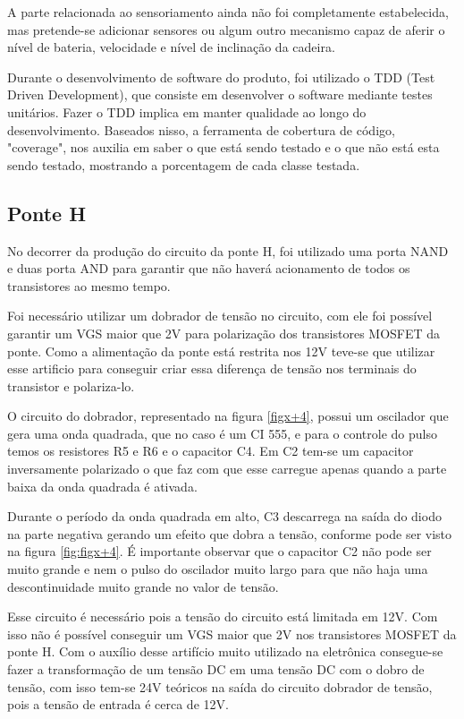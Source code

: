 A parte relacionada ao sensoriamento ainda não foi completamente estabelecida, mas pretende-se adicionar sensores ou algum outro mecanismo capaz de aferir o nível de bateria, velocidade e nível de inclinação da cadeira.

Durante o desenvolvimento de software do produto, foi utilizado o TDD (Test Driven Development), que consiste em desenvolver o software mediante testes unitários. Fazer o TDD implica em manter qualidade ao longo do desenvolvimento. Baseados nisso, a ferramenta de cobertura de código, "coverage", nos auxilia em saber o que está sendo testado e o que não está esta sendo testado, mostrando a porcentagem de cada classe testada.

\subsection{Ponte H}

No decorrer da produção do circuito da ponte H, foi utilizado uma porta NAND e duas porta AND para garantir que não haverá acionamento de todos os transistores ao mesmo tempo.

Foi necessário utilizar um dobrador de tensão no circuito, com ele foi possível garantir um VGS maior que 2V para polarização dos transistores MOSFET da ponte. Como a alimentação da ponte está restrita nos 12V teve-se que utilizar esse artificio para conseguir criar essa diferença de tensão nos terminais do transistor e polariza-lo.

O circuito do dobrador, representado na figura \ref{figx+4}, possui um oscilador que gera uma onda quadrada, que no caso é um CI 555, e para o controle do pulso temos os resistores R5 e R6 e o capacitor C4. Em C2 tem-se um capacitor inversamente polarizado o que faz com que esse carregue apenas quando a parte baixa da onda quadrada é ativada.

Durante o período da onda quadrada em alto, C3 descarrega na saída do diodo na parte negativa gerando um efeito que dobra a tensão, conforme pode ser visto na figura \ref{fig:figx+4}. É importante observar que o capacitor C2 não pode ser muito grande e nem o pulso do oscilador muito largo para que não haja uma descontinuidade muito grande no valor de tensão.

Esse circuito é necessário pois a tensão do circuito está limitada em 12V. Com isso não é possível conseguir um VGS maior que 2V nos transistores MOSFET da ponte H. Com o auxílio desse artifício muito utilizado na eletrônica consegue-se fazer a transformação de um tensão DC em uma tensão DC com o dobro de tensão, com isso tem-se 24V teóricos na saída do circuito dobrador de tensão, pois a tensão de entrada é cerca de 12V.

